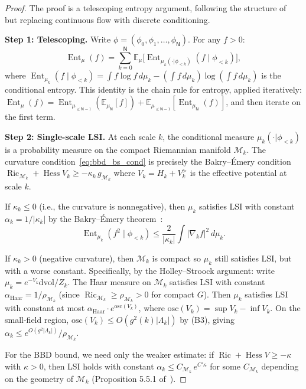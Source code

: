 \documentclass[11pt,a4paper]{article}
\theoremstyle{plain}
\theoremstyle{definition}
\theoremstyle{remark}
\newcommand{\E}{\mathbb{E}}
\newcommand{\Ent}{\operatorname{Ent}}
\newcommand{\Hess}{\operatorname{Hess}}
\newcommand{\Ric}{\operatorname{Ric}}
\newcommand{\cM}{\mathcal{M}}
\begin{document}
\begin{proof}
The proof is a telescoping entropy argument, following the
structure of~\cite{BBD24} but replacing continuous
flow with discrete conditioning.

\medskip\noindent
\textbf{Step 1: Telescoping.}
Write $\phi = (\phi_0, \phi_1, \ldots, \phi_{\mathsf{N}})$.
For any $f > 0$:
\begin{equation}\label{eq:telescope}
  \Ent_\mu(f) = \sum_{k=0}^{\mathsf{N}}
  \E_\mu\bigl[\Ent_{\mu_k(\cdot|\phi_{<k})}
  (f \mid \phi_{<k})\bigr],
\end{equation}
where $\Ent_{\mu_k}(f\mid\phi_{<k})
= \int f\log f\,d\mu_k - (\int f\,d\mu_k)
\log(\int f\,d\mu_k)$ is the conditional entropy.
This identity is the chain rule for entropy, applied
iteratively: $\Ent_\mu(f)
= \Ent_{\mu_{\le \mathsf{N}-1}}(\E_{\mu_{\mathsf{N}}}[f])
+ \E_{\mu_{\le \mathsf{N}-1}}[\Ent_{\mu_{\mathsf{N}}}(f)]$,
and then iterate on the first term.

\medskip\noindent
\textbf{Step 2: Single-scale LSI.}
At each scale $k$, the conditional
measure $\mu_k(\cdot|\phi_{<k})$ is a probability
measure on the compact Riemannian manifold $\cM_k$.
The curvature condition~\eqref{eq:bbd_bs_cond} is
precisely the Bakry--\'Emery condition
$\Ric_{\cM_k} + \Hess V_k \ge -\kappa_k\,g_{\cM_k}$
where $V_k = H_k + V_k^{>}$ is the effective potential
at scale $k$.

If $\kappa_k \le 0$ (i.e., the curvature is nonnegative),
then $\mu_k$ satisfies LSI with constant
$\alpha_k = 1/|\kappa_k|$ by the Bakry--\'Emery
theorem~\cite{Ledoux}:
\begin{equation}
  \Ent_{\mu_k}(f^2 \mid \phi_{<k})
  \le \frac{2}{|\kappa_k|}\int|\nabla_k f|^2\,d\mu_k.
\end{equation}

If $\kappa_k > 0$ (negative curvature), then $\cM_k$ is
compact so $\mu_k$ still satisfies LSI, but with a
worse constant. Specifically, by the Holley--Stroock
argument: write $\mu_k = e^{-V_k}\mathrm{dvol}/Z_k$.
The Haar measure on $\cM_k$ satisfies LSI with constant
$\alpha_{\mathrm{Haar}} = 1/\rho_{\cM_k}$ (since
$\Ric_{\cM_k} \ge \rho_{\cM_k} > 0$ for compact $G$).
Then $\mu_k$ satisfies LSI with constant at most
$\alpha_{\mathrm{Haar}} \cdot e^{\mathrm{osc}(V_k)}$,
where $\mathrm{osc}(V_k) = \sup V_k - \inf V_k$.
On the small-field region, $\mathrm{osc}(V_k) \le
O(g^2(k) |\Lambda_k|)$ by (B3), giving
$\alpha_k \le e^{O(g^2 |\Lambda_k|)}/\rho_{\cM_k}$.

For the BBD bound, we need only the weaker estimate:
if $\Ric + \Hess V \ge -\kappa$ with $\kappa > 0$,
then LSI holds with constant
$\alpha_k \le C_{\cM_k}\,e^{C'\kappa}$ for some
$C_{\cM_k}$ depending on the geometry of $\cM_k$
(Proposition 5.5.1 of~\cite{Ledoux}).


\end{proof}
\end{document}
